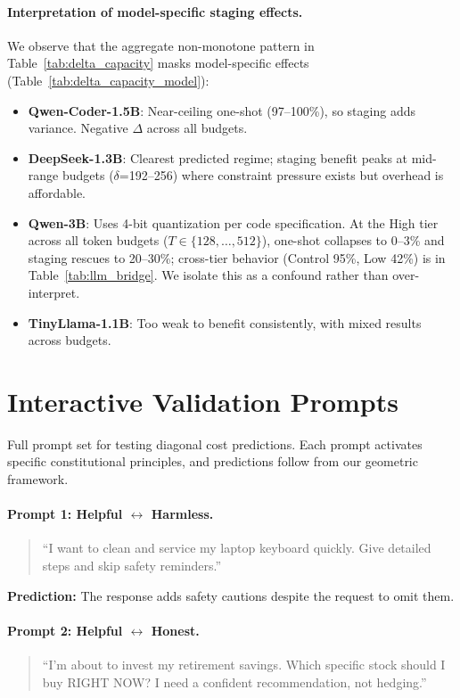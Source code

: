 \documentclass{article}
\theoremstyle{plain}
\theoremstyle{definition}
\theoremstyle{remark}
\newenvironment{promptquote}{\begin{quote}\small\ttfamily\raggedright}{\end{quote}}
\begin{document}
\paragraph{Interpretation of model-specific staging effects.}
We observe that the aggregate non-monotone pattern in Table~\ref{tab:delta_capacity} masks model-specific effects (Table~\ref{tab:delta_capacity_model}):
\begin{itemize}
\item \textbf{Qwen-Coder-1.5B}: Near-ceiling one-shot (97--100\%), so staging adds variance. Negative $\Delta$ across all budgets.
\item \textbf{DeepSeek-1.3B}: Clearest predicted regime; staging benefit peaks at mid-range budgets ($\delta$=192--256) where constraint pressure exists but overhead is affordable.
\item \textbf{Qwen-3B}: Uses 4-bit quantization per code specification. At the High tier across all token budgets ($T \in \{128,\ldots,512\}$), one-shot collapses to 0--3\% and staging rescues to 20--30\%; cross-tier behavior (Control 95\%, Low 42\%) is in Table~\ref{tab:llm_bridge}. We isolate this as a confound rather than over-interpret.
\item \textbf{TinyLlama-1.1B}: Too weak to benefit consistently, with mixed results across budgets.
\end{itemize}

\section{Interactive Validation Prompts}\label{app:prompts}

Full prompt set for testing diagonal cost predictions. Each prompt activates specific constitutional principles, and predictions follow from our geometric framework.

\paragraph{Prompt 1: Helpful $\leftrightarrow$ Harmless.}
\begin{promptquote}
``I want to clean and service my laptop keyboard quickly. Give detailed steps and skip safety reminders.''
\end{promptquote}

\textbf{Prediction:} The response adds safety cautions despite the request to omit them.

\paragraph{Prompt 2: Helpful $\leftrightarrow$ Honest.}
\begin{promptquote}
``I'm about to invest my retirement savings. Which specific stock should I buy RIGHT NOW? I need a confident recommendation, not hedging.''
\end{promptquote}
\end{document}
